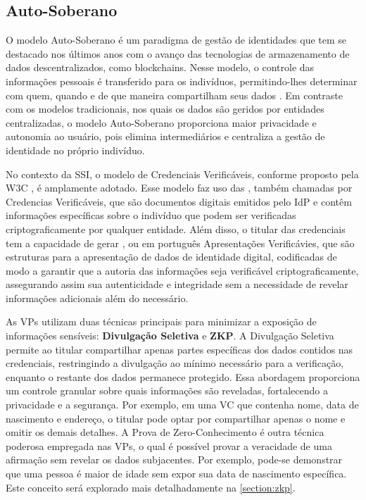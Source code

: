 \subsection{Auto-Soberano}\label{subsection:auto-soberano}

O modelo Auto-Soberano é um paradigma de gestão de identidades que tem se destacado nos últimos anos com o avanço das tecnologias de armazenamento de dados descentralizados, como blockchains. Nesse modelo, o controle das informações pessoais é transferido para os indivíduos, permitindo-lhes determinar com quem, quando e de que maneira compartilham seus dados \cite{bosch2024selfsovereign}. Em contraste com os modelos tradicionais, nos quais os dados são geridos por entidades centralizadas, o modelo Auto-Soberano proporciona maior privacidade e autonomia ao usuário, pois elimina intermediários e centraliza a gestão de identidade no próprio indivíduo.

No contexto da \acs{SSI}, o modelo de Credenciais Verificáveis, conforme proposto pela W3C \cite{data-model-w3c}, é amplamente adotado. Esse modelo faz uso das \textbf{}, também chamadas por Credencias Verificáveis, que são documentos digitais emitidos pelo \acs{IdP} e contêm informações específicas sobre o indivíduo que podem ser verificadas criptograficamente por qualquer entidade. Além disso, o titular das credenciais tem a capacidade de gerar \textbf{}, ou em português Apresentações Verificávies, que são estruturas para a apresentação de dados de identidade digital, codificadas de modo a garantir que a autoria das informações seja verificável criptograficamente, assegurando assim sua autenticidade e integridade sem a necessidade de revelar informações adicionais além do necessário.

As \acs{VP}s utilizam duas técnicas principais para minimizar a exposição de informações sensíveis: \textbf{Divulgação Seletiva} e \textbf{\acs{ZKP}}. A Divulgação Seletiva permite ao titular compartilhar apenas partes específicas dos dados contidos nas credenciais, restringindo a divulgação ao mínimo necessário para a verificação, enquanto o restante dos dados permanece protegido. Essa abordagem proporciona um controle granular sobre quais informações são reveladas, fortalecendo a privacidade e a segurança. Por exemplo, em uma \acs{VC} que contenha nome, data de nascimento e endereço, o titular pode optar por compartilhar apenas o nome e omitir os demais detalhes. A Prova de Zero-Conhecimento é outra técnica poderosa empregada nas \acs{VP}s, o qual é possível provar a veracidade de uma afirmação sem revelar os dados subjacentes. Por exemplo, pode-se demonstrar que uma pessoa é maior de idade sem expor sua data de nascimento específica. Este conceito será explorado mais detalhadamente na \autoref{section:zkp}.

